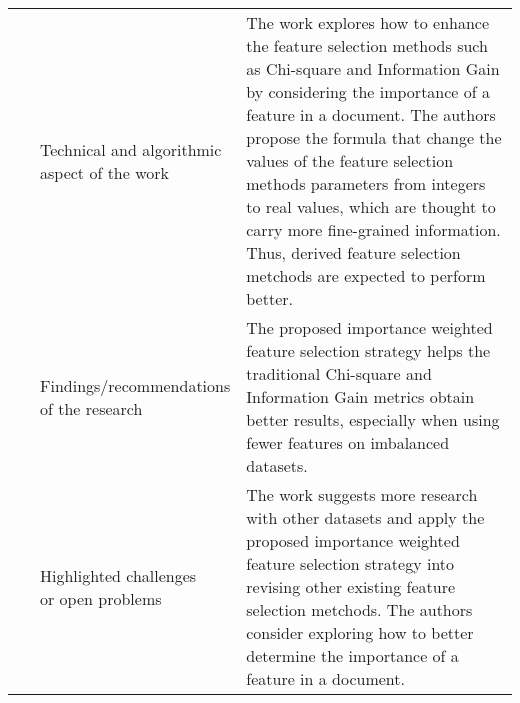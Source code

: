 \begin{landscape}
\begin{longtable}{lp{}p{}}
	\multirow{3}[0]{*}{~\citep{Li2016}} & 
    \specialcell{Technical and algorithmic \\ aspect of the work} &
	The work explores how to enhance the feature selection methods such as Chi-square and Information Gain by considering the importance of a feature in a document. The authors propose the formula that change the values of the feature selection methods parameters from integers to real values, which are thought to carry more fine-grained information. Thus, derived feature selection metchods are expected to perform better.    
    \\ & 
    \specialcell{Findings/recommendations \\ of the research} & 
	The proposed importance weighted feature selection strategy helps the traditional Chi-square and Information Gain metrics obtain better results, especially when using fewer features on imbalanced datasets.
    \\ & 
    \specialcell{Highlighted challenges \\ or open problems} & 
    The work suggests more research with other datasets and apply the proposed importance weighted feature selection strategy into revising other existing feature selection metchods. The authors consider exploring how to better determine the importance of a feature in a document.
	\\
	

\end{longtable}
\end{landscape}
